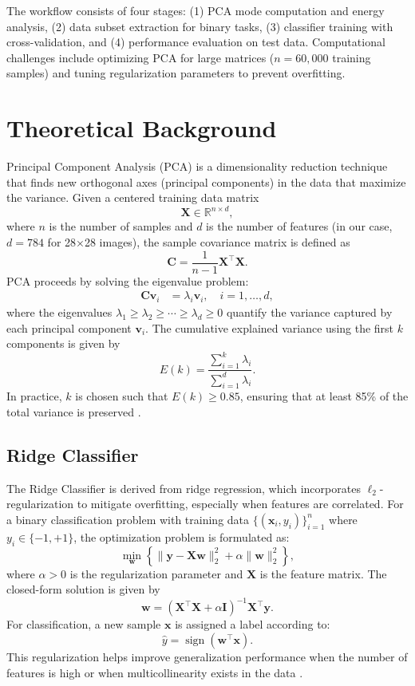 \documentclass[11pt]{amsart}
\begin{document}
The workflow consists of four stages: (1) PCA mode computation and energy analysis, (2) data subset extraction for binary tasks, (3) classifier training with cross-validation, and (4) performance evaluation on test data. Computational challenges include optimizing PCA for large matrices (\( n = 60,000 \) training samples) and tuning regularization parameters to prevent overfitting.

\section{Theoretical Background}

Principal Component Analysis (PCA) is a dimensionality reduction technique that finds new orthogonal axes (principal components) in the data that maximize the variance. Given a centered training data matrix 
\[
\mathbf{X} \in \mathbb{R}^{n \times d},
\]
where \(n\) is the number of samples and \(d\) is the number of features (in our case, \(d=784\) for 28×28 images), the sample covariance matrix is defined as
\[
\mathbf{C} = \frac{1}{n-1}\mathbf{X}^\top \mathbf{X}.
\]
PCA proceeds by solving the eigenvalue problem:
\begin{align*}
\mathbf{C}\mathbf{v}_i &= \lambda_i \mathbf{v}_i, \quad i = 1,\dots,d,
\end{align*}
where the eigenvalues \(\lambda_1 \geq \lambda_2 \geq \cdots \geq \lambda_d \geq 0\) quantify the variance captured by each principal component \(\mathbf{v}_i\). The cumulative explained variance using the first \(k\) components is given by
\[
E(k) = \frac{\sum_{i=1}^{k}\lambda_i}{\sum_{i=1}^{d}\lambda_i}.
\]
In practice, \(k\) is chosen such that \(E(k) \geq 0.85\), ensuring that at least 85\% of the total variance is preserved \cite{Jolliffe2016}.


\subsection{Ridge Classifier}
The Ridge Classifier is derived from ridge regression, which incorporates \(\ell_2\)-regularization to mitigate overfitting, especially when features are correlated. For a binary classification problem with training data \(\{(\mathbf{x}_i, y_i)\}_{i=1}^n\) where \(y_i \in \{-1, +1\}\), the optimization problem is formulated as:
\[
\min_{\mathbf{w}} \left\{ \|\mathbf{y} - \mathbf{X}\mathbf{w}\|_2^2 + \alpha \|\mathbf{w}\|_2^2 \right\},
\]
where \(\alpha > 0\) is the regularization parameter and \(\mathbf{X}\) is the feature matrix. The closed-form solution is given by
\[
\mathbf{w} = \left(\mathbf{X}^\top \mathbf{X} + \alpha \mathbf{I}\right)^{-1}\mathbf{X}^\top \mathbf{y}.
\]
For classification, a new sample \(\mathbf{x}\) is assigned a label according to:
\[
\hat{y} = \operatorname{sign}(\mathbf{w}^\top \mathbf{x}).
\]
This regularization helps improve generalization performance when the number of features is high or when multicollinearity exists in the data \cite{Hoerl1970}.
\end{document}
